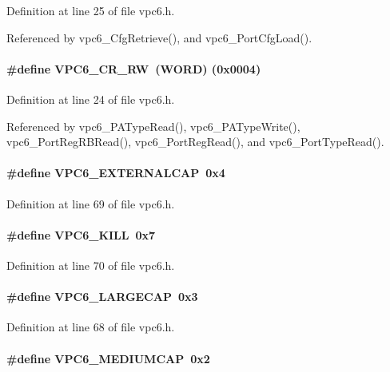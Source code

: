 Definition at line 25 of file vpc6.h.

Referenced by vpc6\_\-CfgRetrieve(), and vpc6\_\-PortCfgLoad().
\paragraph[{VPC6\_\-CR\_\-RW}]{\setlength{\rightskip}{0pt plus 5cm}\#define VPC6\_\-CR\_\-RW~({\bf WORD}) (0x0004)}\hfill\label{vpc6_8h_aaf2958f6165d73f48153e58d53019413}


Definition at line 24 of file vpc6.h.

Referenced by vpc6\_\-PATypeRead(), vpc6\_\-PATypeWrite(), vpc6\_\-PortRegRBRead(), vpc6\_\-PortRegRead(), and vpc6\_\-PortTypeRead().
\paragraph[{VPC6\_\-EXTERNALCAP}]{\setlength{\rightskip}{0pt plus 5cm}\#define VPC6\_\-EXTERNALCAP~0x4}\hfill\label{vpc6_8h_a0902601cb6b9c5751e17e1f197d21e7e}


Definition at line 69 of file vpc6.h.
\paragraph[{VPC6\_\-KILL}]{\setlength{\rightskip}{0pt plus 5cm}\#define VPC6\_\-KILL~0x7}\hfill\label{vpc6_8h_a923645095d7b89d569b87b1eadc3caba}


Definition at line 70 of file vpc6.h.
\paragraph[{VPC6\_\-LARGECAP}]{\setlength{\rightskip}{0pt plus 5cm}\#define VPC6\_\-LARGECAP~0x3}\hfill\label{vpc6_8h_a401109ffeae5c5725bd86d438c89fe88}


Definition at line 68 of file vpc6.h.
\paragraph[{VPC6\_\-MEDIUMCAP}]{\setlength{\rightskip}{0pt plus 5cm}\#define VPC6\_\-MEDIUMCAP~0x2}\hfill\label{vpc6_8h_a557bd5f35ed64fdd9cb66dce81fbbeb6}



